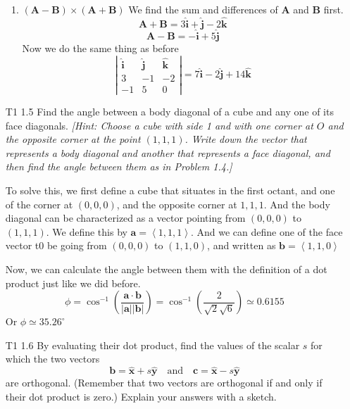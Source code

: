 \documentclass[12pt]{article}
\newcommand{\paren}[1]{\left( #1 \right)}
\newcommand{\tribkt}[1]{\left< #1 \right>}
\newcommand{\abso}[1]{\left|#1 \right|}
\newcommand{\unx}{\hat{\mathbf{x}}}
\newcommand{\uny}{\hat{\mathbf{y}}}
\newcommand{\uni}{\hat{\mathbf{i}}}
\newcommand{\unj}{\hat{\mathbf{j}}}
\newcommand{\unk}{\hat{\mathbf{k}}}
\begin{document}
\begin{enumerate}
\begin{enumerate}
    
    \item \((\mathbf{A} - \mathbf{B}) \times (\mathbf{A} + \mathbf{B})\)
    We find the sum and differences of \textbf{A} and \textbf{B} first.
    \[
    \mathbf{A} + \mathbf{B} = 3\uni + \unj - 2\unk
    \]
    \[
    \mathbf{A} - \mathbf{B} = -\uni + 5\unj 
    \]
    Now we do the same thing as before
    \[
    \abso{
    \begin{matrix}
        \uni & \unj & \unk\\
        3 & -1 & -2\\
        -1& 5 & 0
    \end{matrix}
    } = 7\uni -2\unj + 14\unk 
    \]
\end{enumerate}

    \item[T1 1.5]Find the angle between a body diagonal of a cube and any one of its face diagonals. \textit{[Hint: Choose a cube with side 1 and with one corner at $O$ and the opposite corner at the point $(1, 1, 1)$. Write down the vector that represents a body diagonal and another that represents a face diagonal, and then find the angle between them as in Problem 1.4.]}

    To solve this, we first define a cube that situates in the first octant, and one of the corner at $(0,0,0)$, and the opposite corner at $1,1,1$. And the body diagonal can be characterized as a vector pointing from $(0,0,0)$ to $(1,1,1)$. We define this by $\mathbf{a} = \tribkt{1,1,1}$. And we can define one of the face vector t0 be going from $(0,0,0)$ to $(1,1,0)$, and written as $\mathbf{b} = \tribkt{1,1,0}$

    Now, we can calculate the angle between them with the definition of a dot product just like we did before.
    \[
    \phi = \cos^{-1}\paren{\frac{\mathbf{a}\cdot\mathbf{b}}{\abso{\mathbf{a}}\abso{\mathbf{b}}}} = \cos^{-1}\paren{\frac{2}{\sqrt{2}\sqrt{6}}} \simeq 0.6155
    \]
    Or $\phi \simeq 35.26^\circ$

    \item[T1 1.6] By evaluating their dot product, find the values of the scalar $s$ for which the two vectors
        \[
        \mathbf{b} = \unx + s\uny \quad \text{and} \quad \mathbf{c} = \unx - s\uny
        \]
        are orthogonal. (Remember that two vectors are orthogonal if and only if their dot product is zero.) Explain your answers with a sketch.


\end{enumerate}
\end{document}

